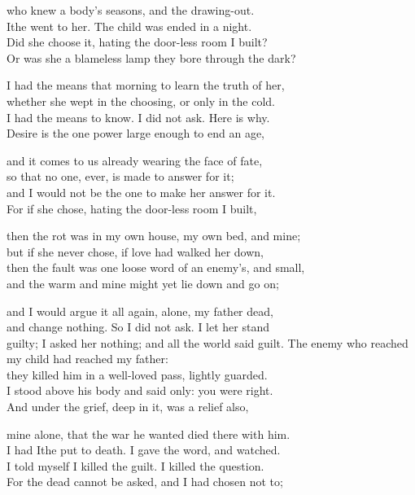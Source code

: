 \begin{founder}
who knew a body's seasons, and the drawing-out.\\
Ithe went to her. The child was ended in a night.\\
Did she choose it, hating the door-less room I built?\\
Or was she a blameless lamp they bore through the dark?\\
\medskip

I had the means that morning to learn the truth of her,\\
whether she wept in the choosing, or only in the cold.\\
I had the means to know. I did not ask. Here is why.\\
Desire is the one power large enough to end an age,\\
\medskip

and it comes to us already wearing the face of fate,\\
so that no one, ever, is made to answer for it;\\
and I would not be the one to make her answer for it.\\
For if she chose, hating the door-less room I built,\\
\medskip

then the rot was in my own house, my own bed, and mine;\\
but if she never chose, if love had walked her down,\\
then the fault was one loose word of an enemy's, and small,\\
and the warm and mine might yet lie down and go on;\\
\medskip

and I would argue it all again, alone, my father dead,\\
and change nothing. So I did not ask. I let her stand\\
guilty; I asked her nothing; and all the world said guilt.
\medskip
The enemy who reached my child had reached my father:\\
they killed him in a well-loved pass, lightly guarded.\\
I stood above his body and said only: you were right.\\
And under the grief, deep in it, was a relief also,\\
\medskip

mine alone, that the war he wanted died there with him.\\
I had Ithe put to death. I gave the word, and watched.\\
I told myself I killed the guilt. I killed the question.\\
For the dead cannot be asked, and I had chosen not to;\\
\medskip


\end{founder}
